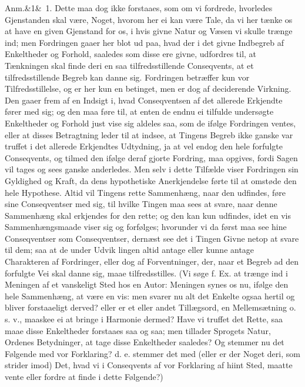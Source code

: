\documentclass[12pt]{book}
\def\sperr#1{#1}%
\def\textit#1{#1}%
\newcommand{\sperr}[1]{\textls[180]{#1}}
\newcommand{\anm}[1]{%
  \par\vspace{0.5\baselineskip}%
  \noindent\hspace{\parindent}\sperr{Anm.}\ifx&#1&\else~\textit{#1}.\fi
  \enspace\ignorespaces
}
\newcommand{\opage}[1]{\marginnote{\footnotesize\textit{[#1]}}}
\begin{document}
\anm{1} Dette maa dog ikke forstaaes, som om vi fordrede, hvorledes Gjenstanden
skal være, Noget, hvorom her ei kan være Tale, da vi her tænke os at have en
given Gjenstand for
\opage{108} os, i hvis givne Natur og Væsen vi skulle trænge ind; men Fordringen gaaer her
blot ud paa, hvad der i det givne Indbegreb af Enkeltheder og Forhold, saaledes
som disse ere givne, udfordres til, at Tænkningen skal finde deri en saa
tilfredsstillende Conseqvents, at et tilfredsstillende Begreb kan danne sig.
Fordringen betræffer kun vor Tilfredsstillelse, og er her kun en betinget, men er
dog af deciderende Virkning. Den gaaer frem af en Indsigt i, hvad Conseqventsen
af det allerede Erkjendte fører med sig; og den maa føre til, at enten de endnu
ei tilfulde undersøgte Enkeltheder og Forhold just vise sig aldeles saa, som de
ifølge Fordringen ventes, eller at disses Betragtning leder til at indsee, at
Tingens Begreb ikke ganske var truffet i det allerede Erkjendtes Udtydning, ja at
vel endog den hele forfulgte Conseqvents, og tilmed den ifølge deraf gjorte
Fordring, maa opgives, fordi Sagen vil tages og sees ganske anderledes. Men selv
i dette Tilfælde viser Fordringen sin Gyldighed og Kraft, da dens hypothetiske
Anerkjendelse førte til at omstøde den hele Hypothese. Altid vil Tingens rette
Sammenhæng, naar den udfindes, føre sine Conseqventser med sig, til hvilke
Tingen maa sees at svare, naar denne Sammenhæng skal erkjendes for den rette; og
den kan kun udfindes, idet en vis Sammenhængsmaade viser sig og forfølges;
hvorunder vi da først maa see hine Conseqventser som Conseqventser, dernæst see
det i Tingen Givne netop at svare til dem; saa at de under Udvik%
\opage{109}lingen altid antage eller kunne antage Charakteren af Fordringer, eller dog af
Forventninger, der, naar et Begreb ad den forfulgte Vei skal danne sig, maae
tilfredsstilles. (Vi søge f. Ex. at trænge ind i Meningen af et vanskeligt Sted
hos en Autor: Meningen synes os nu, ifølge den hele Sammenhæng, at være en vis:
men svarer nu alt det Enkelte ogsaa hertil og bliver forstaaeligt derved? eller
er et eller andet Tillægsord, en Mellemsætning o. s. v., maaskee ei at bringe i
Harmonie dermed? Have vi truffet det Rette, saa maae disse Enkeltheder forstaaes
saa og saa; men tillader Sprogets Natur, Ordenes Betydninger, at tage disse
Enkeltheder saaledes? Og stemmer nu det Følgende med vor Forklaring? d. e.
stemmer det med (eller er der Noget deri, som strider imod) Det, hvad vi i
Conseqvents af vor Forklaring af hiint Sted, maatte vente eller fordre at finde
i dette Følgende?)
\end{document}
